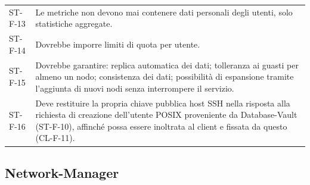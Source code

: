 \begin{longtable}{p{2.6cm} p{\dimexpr\linewidth-2.6cm-4\tabcolsep\relax}}
ST-F-13 & Le metriche non devono mai contenere dati personali degli utenti, solo statistiche aggregate. \\
ST-F-14 & Dovrebbe imporre limiti di quota per utente. \\
ST-F-15 & Dovrebbe garantire: replica automatica dei dati; tolleranza ai guasti per almeno un nodo; consistenza dei dati; possibilità di espansione tramite l'aggiunta di nuovi nodi senza interrompere il servizio. \\
ST-F-16 & Deve restituire la propria chiave pubblica host SSH nella risposta alla richiesta di creazione dell'utente POSIX proveniente da Database-Vault (ST-F-10), affinché possa essere inoltrata al client e fissata da questo (CL-F-11). \\
\end{longtable}

\subsection{Network-Manager}

